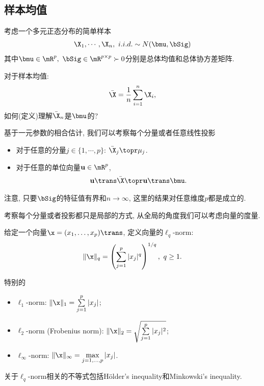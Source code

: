\subsection{样本均值}
考虑一个多元正态分布的简单样本
\begin{align*}
	\X_1,\cdots, \X_n,~i.i.d.\sim N(\bmu, \bSig)
\end{align*}	
其中$\bmu \in \mR^p,~\bSig \in \mR^{p \times p} \succ 0$分别是总体均值和总体协方差矩阵.

\begin{ques}
	对于样本均值:
	\begin{align*}
		\bar{\X}=\frac{1}{n} \sum_{i=1}^n \X_i,
	\end{align*}	
	如何(定义)理解$\bar{\X}_n$是$\bmu$的? 
\end{ques}
\bigskip

基于一元参数的相合估计, 我们可以考察每个分量或者任意线性投影
\begin{itemize}
	\item 对于任意的分量$j \in \{1,\cdots,p\}$:  $\bar{\X}_j \topr \mu_j$.
	\item 对于任意的单位向量$\u \in \mR^p$, 
	\begin{align*}
		\u \trans \bar{\X} \topr \u \trans \bmu.
	\end{align*}
\end{itemize}
注意, 只要$\bSig$的特征值有界和$n \to \infty$, 这里的结果对任意维度$p$都是成立的.
\bigskip


考察每个分量或者投影都只是局部的方式, 从全局的角度我们可以考虑向量的度量.
\begin{defin}
给定一个向量$\x=(x_1,\ldots,x_p)\trans$, 定义向量的$\ell_q$-norm:
\begin{align*}
	\|\x\|_q=\left(\sum_{j=1}^p |x_j|^q  \right)^{1/q},~q\geq 1.
\end{align*}	
\end{defin}
特别的
\begin{itemize}
	\item $\ell_1$-norm: $\|\x\|_1=\sum \limits_{j=1}^p |x_j|$;
	\item $\ell_2$-norm (Frobenius norm): $\|\x\|_2=\sqrt{\sum \limits_{j=1}^p |x_j|^2}$;
	\item $\ell_\infty$-norm: $\|\x\|_\infty=\max\limits_{j=1,\ldots,p} |x_j|$.
\end{itemize}	
关于$\ell_q$-norm相关的不等式包括Hölder's inequality和Minkowski's inequality.
\bigskip

